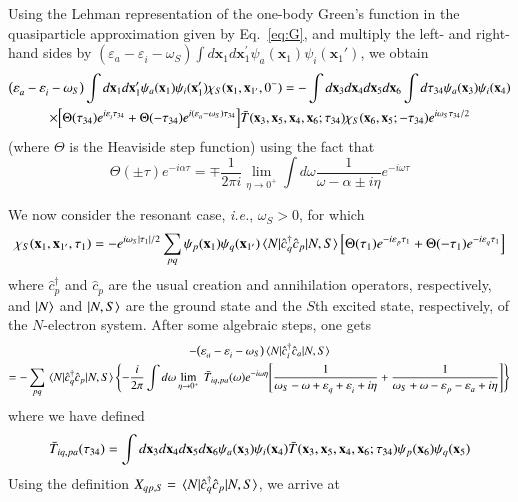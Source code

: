 \documentclass[aip,jcp,reprint,noshowkeys,superscriptaddress]{revtex4-1}
\newcommand{\ie}{\textit{i.e.}}
\newcommand{\bx}{\mathbf{x}}
\newcommand{\e}[2]{\eps_{#1}^{#2}}
\newcommand{\SO}[1]{\psi_{#1}}
\newcommand{\eps}{\varepsilon}
\begin{document}
Using the Lehman representation of the one-body Green's function in the quasiparticle approximation given by Eq.~\eqref{eq:G},
and multiply the left- and right-hand sides by $(\e{a}{}-\e{i}{}-\omega_S)\int d\bx_1 d\bx^{\prime}_1 \SO{a}(\bx_1)\SO{i}(\bx_1')$, we obtain  
\begin{multline}
\label{eq:General_DYN}
	\qty(\e{a}{}-\e{i}{}-\omega_S)\int d\bx_1d\bx^{\prime}_1 \SO{a}(\bx_1)\SO{i}(\bx_1')  \chi_S(\bx_1,\bx_{1'},0^-) =
	-\int d\bx_3 d\bx_4 d\bx_5 d\bx_6\int d\tau_{34}\SO{a}(\bx_3)\SO{i}(\bx_4)
	\\
	\times \qty[\Theta(\tau_{34})e^{i\e{i}{}\tau_{34}}+\Theta(-\tau_{34})e^{i(\e{a}{}-\omega_S)\tau_{34}} ]
	\Bar{T}(\bx_3,\bx_5,\bx_4,\bx_6;\tau_{34})\chi_S(\bx_6,\bx_5;-\tau_{34})e^{i\omega_S\tau_{34}/2}
\end{multline}
(where $\Theta$ is the Heaviside step function) using the fact that
\begin{equation}
	\Theta(\pm\tau)e^{-i\alpha \tau}=\mp\frac{1}{2\pi i}\lim_{\eta\to 0^+}\int d\omega \frac{1}{\omega-\alpha\pm i\eta}e^{-i\omega\tau}
\end{equation}

We now consider the resonant case, \ie, $\omega_S>0$, for which 
\begin{equation}
\label{eq:chi_tau}
	\chi_S(\bx_1,\bx_{1'},\tau_1) 
	=-e^{i\omega_S\abs{\tau_1}/2} \sum_{pq}\SO{p}(\bx_1)\SO{q}(\bx_{1'}) \mel{N}{\hat{c}^\dagger_{q}\hat{c}_p}{N,S}
  	\qty[\Theta(\tau_1)e^{-i\e{p}{}\tau_1}+\Theta(-\tau_1)e^{-i\e{q}{}\tau_1} ]
\end{equation}
  where $\hat{c}^\dagger_{p}$ and $\hat{c}_p$ are the usual creation and annihilation operators, respectively, and $\ket{N}$ and $\ket{N,S}$ are the ground state and the $S$th excited state, respectively, of the $N$-electron system.
After some algebraic steps, one gets
\begin{multline}
	-\qty(\e{a}{}-\e{i}{}-\omega_S)\mel{N}{\hat{c}^\dagger_{i}\hat{c}_a}{N,S}
	\\
    = -\sum_{pq}\mel{N}{\hat{c}^\dagger_{q}\hat{c}_p}{N,S}
    \qty{ -\frac{i}{2\pi}\int d\omega \lim_{\eta \to 0^+}\ \Bar{T}_{iq,pa}(\omega) e^{-i\omega\eta} \qty[\frac{1}{\omega_S-\omega+\e{q}{}+\e{i}{}+i\eta}+\frac{1}{\omega_S+\omega-\e{p}{}-\e{a}{}+i\eta} ] }
\end{multline}
where we have defined 
\begin{equation}
	\Bar{T}_{iq,pa}(\tau_{34})=\int d\bx_3 d\bx_4 d\bx_5 d\bx_6 \SO{a}(\bx_3) \SO{i}(\bx_4)\Bar{T}(\bx_3,\bx_5,\bx_4,\bx_6;\tau_{34}) \SO{p}(\bx_6)\SO{q}(\bx_5)
\end{equation}
Using the definition $X_{qp,S}=\mel{N}{\hat{c}^\dagger_{q}\hat{c}_p}{N,S}$, we arrive at
\end{document}
